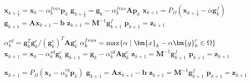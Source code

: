 \documentclass[11pt]{article}
\theoremstyle{plain}
\theoremstyle{definition}
\newcommand{\Vbeta}{\bm{g}^c}
\newcommand{\Vphi}{\bm{g}^f}
\newcommand{\md}{\;\ifnum\currentgrouptype=16 \middle\fi|\;}
\newcommand{\Vb}{\bm{b}}
\newcommand{\Vg}{\bm{g}}
\newcommand{\Vp}{\bm{p}}
\newcommand{\Vx}{\bm{x}}
\newcommand{\Vz}{\bm{z}}
\newcommand{\MA}{\bm{A}}
\newcommand{\MM}{\bm{M}}
\begin{document}
\begin{algorithm}[htbp]
    \SetStartEndCondition{ }{}{}%
    \DontPrintSemicolon
    \AlgoDontDisplayBlockMarkers\SetAlgoNoEnd\SetAlgoNoLine%
    $\Vx_{k+\frac{1}{2}} = \Vx_{k} - \alpha^{feas}_k \Vp_k$\;
    $\Vg_{k+\frac{1}{2}} = \Vg_k - \alpha^{feas}_k \MA \Vp_k$\;
    $\Vx_{k+1} = P_{\Omega} (\Vx_{k+\frac{1}{2}} -\overline{\alpha} \Vg_k^f)$\;
    $\Vg_{k+1} = \MA \Vx_{k+1} -\Vb$\;
    $\Vz_{k+1} = \MM^{-1} \Vphi_{k+1}$\;
    $\Vp_{k+1} = \Vz_{k+1}$\;
    \caption{Preconditioned expansion step}
    \label{alg:expPre}
\end{algorithm}

\begin{algorithm}[htbp]
    \SetStartEndCondition{ }{}{}%
    \DontPrintSemicolon
    \AlgoDontDisplayBlockMarkers\SetAlgoNoEnd\SetAlgoNoLine%
    $\alpha^{sd}_k = \Vg^T_k \Vbeta_k / (\Vbeta_k)^T \MA \Vbeta_k$\;
    $\alpha^{feas}_k = \max\{\alpha \md \Vx_k - \alpha \Vbeta_k \in \Omega\}$\;
    $\Vx_{k+1} = \Vx_{k} -\alpha^{sd}_k\Vbeta_k$\;
    $\Vg_{k+1} = \Vg_{k} - \alpha^{sd}_k \MA \Vbeta_k$\;
    $\Vz_{k+1} = \MM^{-1} \Vphi_{k+1}$\;
    $\Vp_{k+1} = \Vz_{k+1}$\;
    \caption{Preconditioned proportioning step}
    \label{alg:propPre}
\end{algorithm}

\begin{algorithm}[htbp]
    \SetStartEndCondition{ }{}{}%
    \DontPrintSemicolon
    \AlgoDontDisplayBlockMarkers\SetAlgoNoEnd\SetAlgoNoLine%
    $\Vx_{k+1} = P_{\Omega}(\Vx_{k} -\alpha^{cg}_k\Vp_k)$\;
    $\Vg_{k+1} = \MA \Vx_{k+1} -\Vb$\;
    $\Vz_{k+1} = \MM^{-1} \Vphi_{k+1}$\;
    $\Vp_{k+1} = \Vz_{k+1}$\;
    \caption{Preconditioned projected CG step}
    \label{alg:projcgPre}
\end{algorithm}
\end{document}
